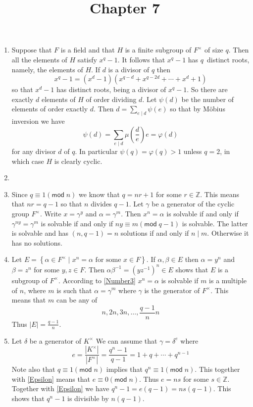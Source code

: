 \documentclass[12pt]{article}
\title{Chapter 7}
\author{}\date{}
\renewcommand{\pmod}[1]{\left(\mathsf{mod}\;#1\right)}
\begin{document}
\maketitle

\begin{enumerate}
\item %
Suppose that $F$ is a field and that $H$ is a finite subgroup
of $F^\times$ of size $q$. Then all the elements
of $H$ satisfy $x^q-1$. It follows that
$x^q-1$ has $q$~distinct roots, namely, the elements of $H$.
 If $d$ is a divisor of $q$ then
\[x^q-1=\left(x^d-1\right)\left(x^{q-d}+x^{q-2d}+\cdots+x^d+1\right)\]
so that $x^d-1$ has distinct roots, being a divisor of $x^q-1$.
So there are exactly $d$ elements of $H$ of order dividing $d$.
Let $\psi\left(d\right)$ be the number of elements of order exactly $d$.
Then $d=\sum_{e\mid d}\psi\left(e\right)$ so that by
M\"obius inversion we have
\[\psi\left(d\right)=\sum_{e\mid d}\mu\left(\frac{d}{e}\right)e
=\varphi\left(d\right)\]
for any divisor $d$ of $q$.
In particular $\psi\left(q\right)=\varphi\left(q\right)>1$
unless $q=2$, in which case $H$ is clearly cyclic.

\item %
\item\label{Number3} %
Since $q\equiv 1\pmod{n}$ we know that $q=nr+1$ for some $r\in\mathbb{Z}$.
This means that $nr=q-1$ so that $n$ divides $q-1$.
Let $\gamma$ be a generator of the cyclic group $F^\times$.
Write $x=\gamma^y$ and $\alpha=\gamma^m$.
Then $x^n=\alpha$ is solvable if and only if
$\gamma^{ny}=\gamma^m$ is solvable
if and only if $ny\equiv m\pmod{q-1}$ is solvable.
The latter is solvable and has $\left(n,q-1\right)=n$
solutions if and only if $n\mid m$. Otherwise it has no solutions.

\item %
Let $E=\left\{\alpha\in F^\times
\mid\text{$x^n=\alpha$ for some $x\in F$}\right\}$.
If $\alpha,\beta\in E$ then $\alpha=y^n$ and $\beta=z^n$
for some $y,z\in F$. Then $\alpha\beta^{-1}
=\left(yz^{-1}\right)^n\in E$ shows that $E$ is a subgroup of $F^\times$.
According to \autoref{Number3} $x^n=\alpha$ is solvable
if $m$ is a multiple of $n$, where $m$ is such that $\alpha=\gamma^m$
where $\gamma$ is the generator of $F^\times$.
This means that $m$ can be any of
\[n,2n,3n,\ldots,\frac{q-1}{n}n\]
Thus $\left|E\right|=\frac{q-1}{n}$.

\item %
Let $\delta$ be a generator of $K^\times$
We can assume that $\gamma=\delta^e$ where
\begin{equation}\label{Epsilon}
e=\frac{\left|K^\times\right|}{\left|F^\times\right|}=\frac{q^n-1}{q-1}
=1+q+\cdots+q^{n-1}
\end{equation}
Note also that $q\equiv 1\pmod{n}$ implies that $q^n\equiv 1\pmod{n}$.
This together with \autoref{Epsilon} means that $e\equiv 0\pmod{n}$.
Thus $e=ns$ for some $s\in\mathbb{Z}$. Together with \autoref{Epsilon}
we have $q^n-1=e\left(q-1\right)=ns\left(q-1\right)$. This shows
that $q^n-1$ is divisible by $n\left(q-1\right)$.


\end{enumerate}
\end{document}
